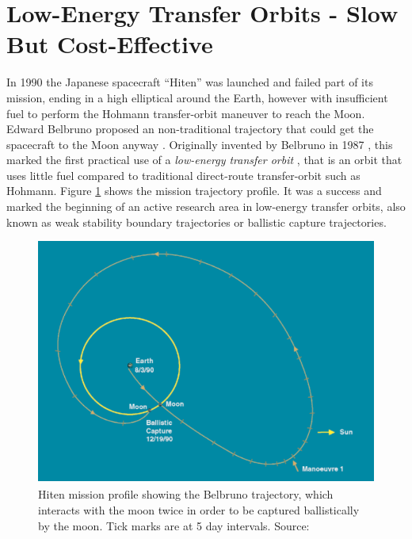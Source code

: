 \section{Low-Energy Transfer Orbits - Slow But Cost-Effective}
In 1990 the Japanese spacecraft ``Hiten'' was launched and failed part of its mission, ending in a high elliptical around the Earth, however with insufficient fuel to perform the Hohmann transfer-orbit maneuver to reach the Moon. Edward Belbruno proposed an non-traditional trajectory that could get the spacecraft to the Moon anyway \cite{universe-today-hiten}. Originally invented by Belbruno in 1987 \cite{Seefelder2002}, this marked the first practical use of a \emph{low-energy transfer orbit} \cite{nasa-hiten}, that is an orbit that uses little fuel compared to traditional direct-route transfer-orbit such as Hohmann. Figure \ref{fig:hiten} shows the mission trajectory profile. It was a success and marked the beginning of an active research area in low-energy transfer orbits, also known as weak stability boundary trajectories or ballistic capture trajectories.

\begin{figure}[ht!]
\centering
\includegraphics[scale=0.8]{fig/hiten.png}
\caption{Hiten mission profile showing the Belbruno trajectory, which interacts with the moon twice in order to be captured ballistically by the moon. Tick marks are at 5 day intervals. Source: \cite{Biesbroek2000}}
\label{fig:hiten}
\end{figure}

